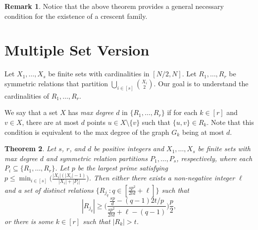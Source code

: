 \documentclass[12pt]{article}
\DeclarePairedDelimiter\ceil{\lceil}{\rceil}
\DeclarePairedDelimiter\floor{\lfloor}{\rfloor}
\newtheorem{thm}{Theorem}[section] %
\theoremstyle{definition}
\newtheorem{rem}[thm]{Remark}
\begin{document}
	\begin{rem}
		Notice that the above theorem provides a general necessary condition for the existence of a crescent family.
	\end{rem}
	\fi

	\newpage
	\section{Multiple Set Version}
	
	Let $X_1,\ldots, X_s$ be finite sets with cardinalities in $[N/2, N]$.  Let $R_1,\ldots, R_r$ be symmetric relations that partition $\bigcup_{i \in [s]}{X_i \choose 2}$.  Our goal is to understand the cardinalities of $R_1,\ldots, R_r$.
	
	We say that a set $X$ has \emph{max degree $d$} in $\{R_1,\ldots,R_r\}$ if for each $k \in [r]$ and $v \in X$, there are at most $d$ points $u\in X \setminus \{v\}$ such that $\{u,v\} \in R_k$.  Note that this condition is equivalent to the max degree of the graph $G_k$ being at most $d$.
	
	\begin{thm}\label{Thm-MainMultipleSetResult}
		Let $s$, $r$, and $d$ be positive integers and $X_1,\ldots, X_s$ be finite sets with max degree $d$ and symmetric relation partitions $P_1,\ldots,P_s$, respectively, where each $P_i \subseteq \{R_1, \ldots, R_r\}$.  Let $p$ be the largest prime satisfying $p \leq \min_{i \in [s]}\big(\tfrac{|X_i|(|X_i|-1)}{|X_i|+|P_i|} \big)$.  Then either there exists a non-negative integer $\ell$ and a set of distinct relations $\{R_{j_q}: q \in [\tfrac{sp^2}{2td} + \ell]\}$ such that 
		$$|R_{j_q}| \geq \biggr(\frac{\tfrac{sp}{d}-(q-1)2t/p}{\tfrac{sp^2}{2td} + \ell-(q-1)} \biggr)\frac{p}{2},$$ 
		or there is some $k \in [r]$ such that $|R_k| > t$.%
	\end{thm}
\end{document}
